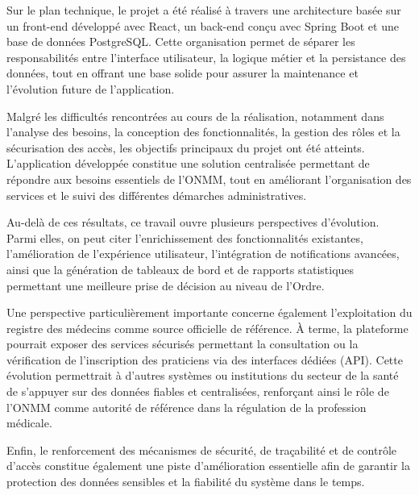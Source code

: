 ﻿\documentclass[12pt,a4paper]{report}
\begin{document}
Sur le plan technique, le projet a été réalisé à travers une architecture basée sur un front-end développé avec React, un back-end conçu avec Spring Boot et une base de données PostgreSQL. Cette organisation permet de séparer les responsabilités entre l’interface utilisateur, la logique métier et la persistance des données, tout en offrant une base solide pour assurer la maintenance et l’évolution future de l’application.

Malgré les difficultés rencontrées au cours de la réalisation, notamment dans l’analyse des besoins, la conception des fonctionnalités, la gestion des rôles et la sécurisation des accès, les objectifs principaux du projet ont été atteints. L’application développée constitue une solution centralisée permettant de répondre aux besoins essentiels de l’ONMM, tout en améliorant l’organisation des services et le suivi des différentes démarches administratives.

Au-delà de ces résultats, ce travail ouvre plusieurs perspectives d’évolution. Parmi elles, on peut citer l’enrichissement des fonctionnalités existantes, l’amélioration de l’expérience utilisateur, l’intégration de notifications avancées, ainsi que la génération de tableaux de bord et de rapports statistiques permettant une meilleure prise de décision au niveau de l’Ordre.

Une perspective particulièrement importante concerne également l’exploitation du registre des médecins comme source officielle de référence. À terme, la plateforme pourrait exposer des services sécurisés permettant la consultation ou la vérification de l’inscription des praticiens via des interfaces dédiées (API). Cette évolution permettrait à d’autres systèmes ou institutions du secteur de la santé de s’appuyer sur des données fiables et centralisées, renforçant ainsi le rôle de l’ONMM comme autorité de référence dans la régulation de la profession médicale.

Enfin, le renforcement des mécanismes de sécurité, de traçabilité et de contrôle d’accès constitue également une piste d’amélioration essentielle afin de garantir la protection des données sensibles et la fiabilité du système dans le temps.
\end{document}
